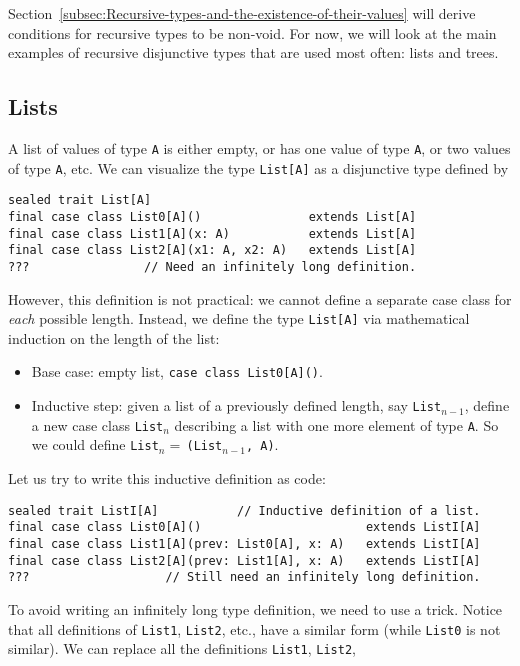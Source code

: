 Section~\ref{subsec:Recursive-types-and-the-existence-of-their-values}
will derive conditions for recursive types to be non-void. For now,
we will look at the main examples of recursive disjunctive types that
are used most often: lists and trees.

\subsection{Lists}

A list of values of type \lstinline!A! is either empty, or has one
value of type \lstinline!A!, or two values of type \lstinline!A!,
etc. We can visualize the type \lstinline!List[A]! as a disjunctive
type defined by
\begin{lstlisting}
sealed trait List[A]
final case class List0[A]()               extends List[A]
final case class List1[A](x: A)           extends List[A]
final case class List2[A](x1: A, x2: A)   extends List[A]
???                // Need an infinitely long definition.
\end{lstlisting}
However, this definition is not practical: we cannot define a separate
case class for \emph{each} possible length. Instead, we define the
type \lstinline!List[A]! via mathematical induction on the length
of the list:
\begin{itemize}
\item Base case: empty list, \lstinline!case class List0[A]()!.
\item Inductive step: given a list of a previously defined length, say \lstinline!List!$_{n-1}$,
define a new case class \lstinline!List!$_{n}$ describing a list
with one more element of type \lstinline!A!. So we could define \lstinline!List!$_{n}=\,$\lstinline!(List!$_{n-1}$\lstinline!, A)!.
\end{itemize}
Let us try to write this inductive definition as code:
\begin{lstlisting}
sealed trait ListI[A]           // Inductive definition of a list.
final case class List0[A]()                       extends ListI[A]
final case class List1[A](prev: List0[A], x: A)   extends ListI[A]
final case class List2[A](prev: List1[A], x: A)   extends ListI[A]
???                   // Still need an infinitely long definition.
\end{lstlisting}
To avoid writing an infinitely long type definition, we need to use
a trick. Notice that all definitions of \lstinline!List1!, \lstinline!List2!,
etc., have a similar form (while \lstinline!List0! is not similar).
We can replace all the definitions \lstinline!List1!, \lstinline!List2!,
